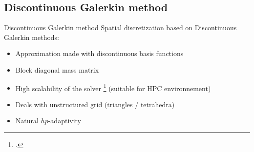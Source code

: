 \subsection{Discontinuous Galerkin method}
\begin{frame}{Discontinuous Galerkin method}
\vspace{-1.5cm}
Spatial discretization based on Discontinuous Galerkin methods:
\vspace{0.5cm}
\begin{itemize}
\item<1-> Approximation made with discontinuous basis functions
\item<2-> Block diagonal mass matrix
\item<3-> High scalability of the solver \footcite{shraggeSolving3DAcoustic2014} (suitable for HPC environnement)
\item<4-> Deals with unstructured grid (triangles / tetrahedra)
\item<5-> Natural $hp$-adaptivity
\end{itemize}


\end{frame}

